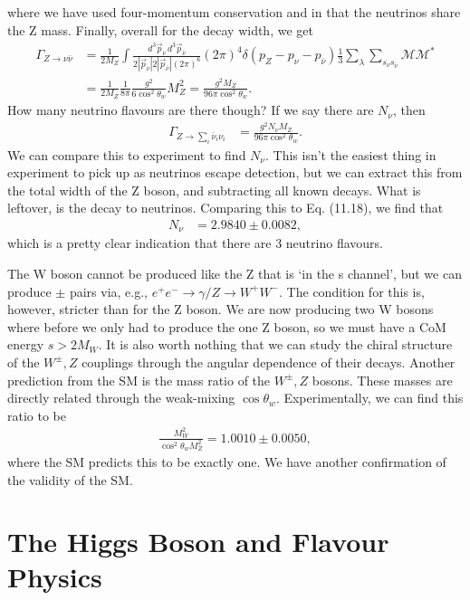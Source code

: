 \documentclass[relqm.tex]{subfiles}
\begin{document}
where we have used four-momentum conservation and in that the neutrinos share the Z mass. 
Finally, overall for the decay width, we get
\begin{align}
    \Gamma_{Z\to\nu\bar{\nu}} &= \frac{1}{2M_Z}\int \frac{d^3\vec{p}_\nu\,d^3\vec{p}_{\bar{\nu}}}{2|\vec{p}_\nu|2|\vec{p}_{\bar{\nu}}|(2\pi)^6} (2\pi)^4\delta(p_Z-p_\nu-p_{\bar{\nu}})\frac13\sum_{\lambda}\sum_{s_\nu s_{\bar{\nu}}} \mathcal{M}\mathcal{M}^* \\
                              &= \frac{1}{2M_Z}\frac{1}{8\pi}\frac{g^2}{6\cos^2\theta_w}M_Z^2 = \frac{g^2 M_Z}{96\pi \cos^2\theta_w}.
\end{align}
How many neutrino flavours are there though?
If we say there are $N_\nu$, then
\begin{align}
    \Gamma_{Z\to\sum_i\bar{\nu}_i\nu_i} &= \frac{g^2 N_\nu M_Z}{96\pi\cos^2\theta_w}.
\end{align}
We can compare this to experiment to find $N_\nu$.
This isn't the easiest thing in experiment to pick up as neutrinos escape detection, but we can extract this from the total width of the Z boson, and subtracting all known decays. 
What is leftover, is the decay to neutrinos. 
Comparing this to Eq. (11.18), we find that 
\begin{align}
    N_\nu &= 2.9840 \pm 0.0082,
\end{align}
which is a pretty clear indication that there are 3 neutrino flavours. 

The W boson cannot be produced like the Z that is `in the s channel', but we can produce $\pm$ pairs via, e.g., $e^+e^-\to\gamma/Z\to W^+W^-$.
The condition for this is, however, stricter than for the Z boson. 
We are now producing two W bosons where before we only had to produce the one Z boson, so we must have a CoM energy $s>2M_W$.
It is also worth nothing that we can study the chiral structure of the $W^\pm,Z$ couplings through the angular dependence of their decays. 
Another prediction from the SM is the mass ratio of the $W^\pm,Z$ bosons. 
These masses are directly related through the weak-mixing $\cos\theta_w$.
Experimentally, we can find this ratio to be
\begin{align}
    \frac{M_W^2}{\cos^2\theta_w M_Z^2} = 1.0010\pm0.0050,
\end{align}
where the SM predicts this to be exactly one. 
We have another confirmation of the validity of the SM. 

\chapter{The Higgs Boson and Flavour Physics}
\end{document}
